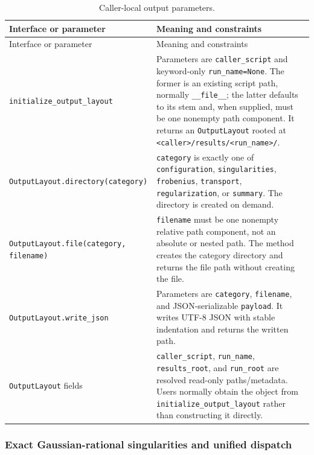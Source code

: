 \documentclass[11pt]{article}
\begin{document}
\small
\begin{longtable}{L{0.36\textwidth}L{0.58\textwidth}}
\caption{Caller-local output parameters.}\label{tab:output-api}\\
\toprule
Interface or parameter & Meaning and constraints \\
\midrule
\endfirsthead
\toprule
Interface or parameter & Meaning and constraints \\
\midrule
\endhead
\texttt{initialize\_output\_layout} & Parameters are \texttt{caller\_script} and keyword-only
\texttt{run\_name=None}.  The former is an existing script path, normally \texttt{\_\_file\_\_};
the latter defaults to its stem and, when supplied, must be one nonempty path component.  It
returns an \texttt{OutputLayout} rooted at
\texttt{<caller>/results/<run\_name>/}. \\
\texttt{OutputLayout.}\newline\texttt{directory(category)} & \texttt{category} is exactly one of
\texttt{configuration}, \texttt{singularities}, \texttt{frobenius}, \texttt{transport},
\texttt{regularization}, or \texttt{summary}.  The directory is created on demand. \\
\texttt{OutputLayout.file(category, filename)} & \texttt{filename} must be one nonempty
relative path component, not an absolute or nested path.  The method creates the category
directory and returns the file path without creating the file. \\
\texttt{OutputLayout.write\_json} & Parameters are \texttt{category}, \texttt{filename}, and
JSON-serializable \texttt{payload}.  It writes UTF-8 JSON with stable indentation and returns
the written path. \\
\texttt{OutputLayout} fields & \texttt{caller\_script}, \texttt{run\_name},
\texttt{results\_root}, and \texttt{run\_root} are resolved read-only paths/metadata.  Users
normally obtain the object from \texttt{initialize\_output\_layout} rather than constructing
it directly. \\
\bottomrule
\end{longtable}
\normalsize

\subsubsection{Exact Gaussian-rational singularities and unified dispatch}
\end{document}
